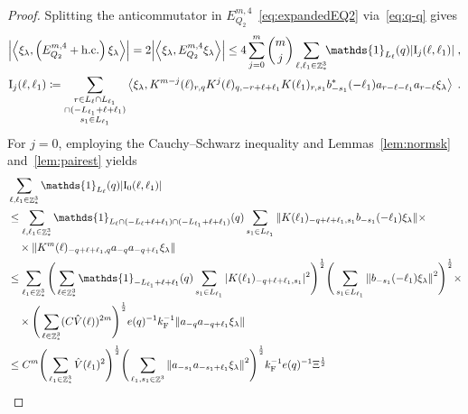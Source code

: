 \documentclass[12pt,a4paper]{article}
\numberwithin{equation}{section}
\newcommand{\1}{\mathbb{I}}
\newcommand{\F}{\mathrm{F}}
\newcommand{\I}{\mathrm{I}}
\DeclareMathOperator{\Z}{\mathbb{Z}}
\newcommand{\half}{\frac{1}{2}}
\newcommand{\eva}[1]{\left\langle #1 \right\rangle}
\theoremstyle{plain}
\theoremstyle{definition}
\theoremstyle{remark}
\theoremstyle{plain}
\theoremstyle{definition}
\theoremstyle{remark}
\begin{document}
\begin{proof}
Splitting the anticommutator in $ E^{m,4}_{Q_2} $~\eqref{eq:expandedEQ2} via~\eqref{eq:q-q} gives
\begin{equation} \label{eq:EQ2171}
\begin{aligned}
	\abs{\eva{\xi_\lambda,\left(E^{m,4}_{Q_2}+\mathrm{h.c.}\right) \xi_\lambda }} 
	= 2\abs{\eva{\xi_\lambda, E^{m,4}_{Q_2} \xi_\lambda }}
	\le 4 \sum_{j=0}^m {{m}\choose j} \sum\limits_{\ell,\ell_1 \in \Z^3_*}\!\! \mathds{1}_{L_\ell}(q) |\I_j(\ell, \ell_1)| \;,\\
	\I_j(\ell, \ell_1)
	\coloneq \sum\limits_{\substack{r\in L_{\ell} \cap L_{\ell_1}\\ \cap (-L_{\ell_1}+\ell+\ell_1)\\ s_1 \in L_{\ell_1}}} 
		\eva{\xi_\lambda, K^{m-j}(\ell)_{r,q} K^{j}(\ell)_{q,-r+\ell+\ell_1} K(\ell_1)_{r,s_1} b^*_{-s_1}(-\ell_1) a_{r-\ell-\ell_1} a_{r-\ell} \xi_\lambda} \;. \\
\end{aligned}
\end{equation}
For $ j = 0 $, employing the Cauchy--Schwarz inequality and Lemmas~\ref{lem:normsk} and~\ref{lem:pairest} yields 
\textcolor{green!30!black}{
\begin{align}
	&\sum_{\ell,\ell_1 \in \Z^3_*} \mathds{1}_{L_\ell}(q) |\I_0(\ell, \ell_1)| \nonumber\\
	&\leq \sum_{\ell,\ell_1 \in \Z^3_*} \mathds{1}_{L_\ell \cap (-L_\ell + \ell + \ell_1) \cap (-L_{\ell_1} + \ell + \ell_1)}(q) \sum\limits_{s_1 \in L_{\ell_1}}
		\norm{K(\ell_1)_{-q+\ell+\ell_1,s_1} b_{-s_1}(-\ell_1)  \xi_\lambda} \times \nonumber\\
	&\quad \times \norm{ K^m(\ell)_{-q+\ell+\ell_1,q}a_{-q}a_{-q+\ell_1}  \xi_\lambda } \nonumber\\
	&\leq \sum_{\ell_1 \in \Z^3_*}
		\Bigg( \sum_{\ell \in \Z^3_*} \mathds{1}_{-L_{\ell_1} + \ell + \ell_1}(q) \sum\limits_{s_1 \in L_{\ell_1}} |K(\ell_1)_{-q+\ell+\ell_1,s_1}|^2 \Bigg)^{\half}
		\Bigg( \sum\limits_{s_1 \in L_{\ell_1}} \norm{ b_{-s_1}(-\ell_1)  \xi_\lambda}^2 \Bigg)^{\half} \times \nonumber\\
	&\quad \times \Bigg( \sum_{\ell \in \Z^3_*} (C \hat{V}(\ell))^{2m} \Bigg)^{\half}
		e(q)^{-1} k_{\F}^{-1}
		\norm{a_{-q}a_{-q+\ell_1}  \xi_\lambda } \nonumber\\
	&\leq C^m \Bigg( \sum_{\ell_1 \in \Z^3_*}
		\hat{V}(\ell_1)^2 \Bigg)^{\half}
		\Bigg( \sum_{\ell_1,s_1 \in \Z^3} \norm{ a_{-s_1} a_{-s_1+\ell_1}  \xi_\lambda}^2 \Bigg)^{\frac 12}
		k_{\F}^{-1} e(q)^{-1} \Xi^\half \nonumber\\

\end{align}}
\end{proof}
\end{document}
